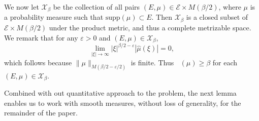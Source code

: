 \documentclass[12pt,reqno]{article}
\numberwithin{equation}{section}
\DeclareMathOperator{\fordim}{\dim_{\mathbf{F}}}
\newtheorem{theorem}{Theorem}
\numberwithin{theorem}{section}
\begin{document}
We now let $\mathcal{X}_\beta$ be the collection of all pairs $(E,\mu) \in \mathcal{E} \times M(\beta/2)$, where $\mu$ is a probability measure such that $\text{supp}(\mu) \subset E$. Then $\mathcal{X}_\beta$ is a closed subset of $\mathcal{E} \times M(\beta/2)$ under the product metric, and thus a complete metrizable space. We remark that for any $\varepsilon > 0$ and $(E,\mu) \in \mathcal{X}_\beta$,
%
\begin{equation} \label{equationGFSCSC4}
    \lim_{|\xi| \to \infty} |\xi|^{\beta/2 - \varepsilon} |\widehat{\mu}(\xi)| = 0,
\end{equation}
%
which follows because $\| \mu \|_{M(\beta/2 - \varepsilon/2)}$ is finite. Thus $\fordim(\mu) \geq \beta$ for each $(E,\mu) \in \mathcal{X}_\beta$.
\begin{comment}
\begin{theorem}
    $\mathcal{X}$ is a closed subset of $\mathcal{E} \times M(\beta)$.
\end{theorem}
\begin{proof}
    Suppose $\{ (E_k,\mu_k) \}$ is a sequence of elements of $\mathcal{X}$ converging to some tuple $(E,\mu) \in \mathcal{E} \times M(\beta)$. Fix $\varepsilon > 0$. Since $E_k \to E$ in the Hausdorff dimension, there exists $k_0$ such that for $k \geq k_0$, $E_k \subset E(\varepsilon)$. Since $\mu_k \to \mu$ weakly, this implies that $\mu$ is a probability measure, and that $\text{supp}(\mu) \subset E(\varepsilon)$. Taking $\varepsilon \to 0$ shows that $\text{supp}(\mu) \subset E$. Again for a fixed $\varepsilon > 0$, applying the triangle inequality and the reverse triangle inequality combined with \eqref{equationGFSCSC4} applied to $\mu_k$, we conclude
    \[ \lim_{|\xi| \to \infty} |\xi|^{\beta/2 - \varepsilon} |\widehat{\mu}(\xi)| = \lim_{|\xi| \to \infty} |\xi|^{\beta/2 - \varepsilon} |\widehat{\mu}(\xi) - \widehat{\mu_k}(\xi)| \leq \| \mu - \mu_k \|_{M(\beta,\varepsilon)}. \]
    Taking $k \to \infty$ shows that
    \[ \lim_{|\xi| \to \infty} |\xi|^{\beta/2 - \varepsilon} |\widehat{\mu}(\xi)| = 0, \]
    which completes the proof.
\end{proof}
\end{comment}

Combined with out quantitative approach to the problem, the next lemma enables us to work with smooth measures, without loss of generality, for the remainder of the paper.
\end{document}
